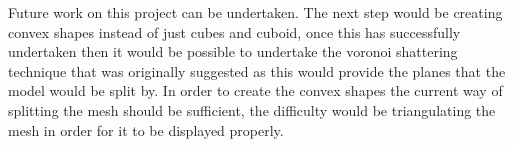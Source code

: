 \documentclass[conference,backref=page]{acmsiggraph}
\begin{document}
Future work on this project can be undertaken. The next step would be creating convex shapes instead of just cubes and cuboid, once this has successfully undertaken then it would be possible to undertake the voronoi shattering technique that was originally suggested as this would provide the planes that the model would be split by. In order to create the convex shapes the current way of splitting the mesh should be sufficient, the difficulty would be triangulating the mesh in order for it to be displayed properly.






\end{document}
